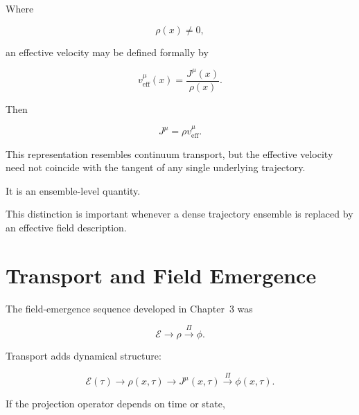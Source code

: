 \documentclass[12pt,oneside]{book}
\begin{document}
Where

\begin{equation}
    \rho(x)
    \neq
    0,
\end{equation}

an effective velocity may be defined formally by

\begin{equation}
    v^\mu_{\mathrm{eff}}(x)
    =
    \frac{J^\mu(x)}
         {\rho(x)}.
    \label{eq:effective-velocity}
\end{equation}

Then

\begin{equation}
    J^\mu
    =
    \rho
    v^\mu_{\mathrm{eff}}.
    \label{eq:current-density-velocity}
\end{equation}

This representation resembles continuum transport, but the
effective velocity need not coincide with the tangent of any
single underlying trajectory.

It is an ensemble-level quantity.

This distinction is important whenever a dense trajectory
ensemble is replaced by an effective field description.


\section{Transport and Field Emergence}
\label{sec:transport-field-emergence}

The field-emergence sequence developed in Chapter~3 was

\begin{equation}
    \mathscr{E}
    \longrightarrow
    \rho
    \xrightarrow{\Pi}
    \phi.
\end{equation}

Transport adds dynamical structure:

\begin{equation}
    \mathscr{E}(\tau)
    \longrightarrow
    \rho(x,\tau)
    \longrightarrow
    J^\mu(x,\tau)
    \xrightarrow{\Pi}
    \phi(x,\tau).
    \label{eq:dynamic-field-emergence}
\end{equation}

If the projection operator depends on time or state,
\end{document}
